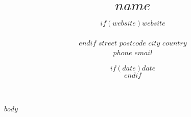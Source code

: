 \documentclass[11pt, a4paper]{article}
\title{$name$} %
\date{$if(date)$$date$\\$endif$} %
\author{$if(website)$$website$\\\\$endif$
$street$ \textbar{} $postcode$ $city$ \textbar{} $country$\\ %
$phone$ \textbar{} $email$ } %
\begin{document}
\maketitle
\begin{raggedright}
$body$
\end{raggedright}
\end{document}
